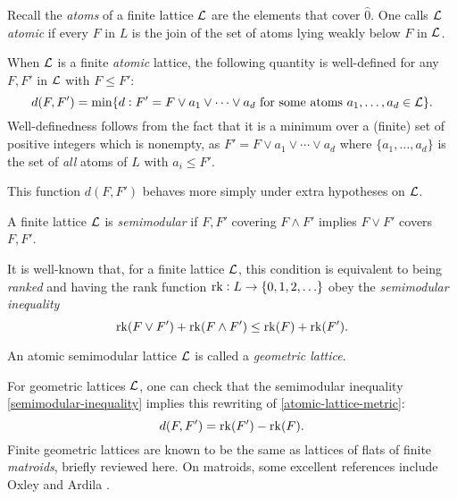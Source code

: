 \begin{defn}
Recall the {\it atoms} of a finite lattice $\mathcal{L}$ are
the elements that cover $\hat{0}$.  One calls $\mathcal{L}$ {\it atomic} if every $F$ in $L$ is the join of the set of atoms lying weakly below $F$ in $\mathcal{L}$.
\end{defn}

When $\mathcal{L}$ is a finite {\it atomic} lattice, the following quantity
is well-defined
for any $F,F'$ in $\mathcal{L}$ with $F \leq F'$:
\begin{equation}
\label{atomic-lattice-metric}
d(F,F')= \min \{d: F'=F \vee a_1 \vee \cdots \vee a_d \text{ for some atoms }a_1,\ldots,a_d \in \mathcal{L}\}.
\end{equation}
Well-definedness follows from the fact that
it is a minimum over a (finite) set of positive integers which is nonempty, as $F'=F \vee a_1 \vee \cdots \vee a_d$ where $\{a_1,\ldots,a_d\}$
is the set of {\it all} atoms of $L$ 
with $a_i \leq F'$.

This function $d(F,F')$ behaves more simply under extra
hypotheses on $\mathcal{L}$.

\begin{defn}
    A finite lattice $\mathcal{L}$ is {\it semimodular} if  $F,F'$ covering $F \wedge F'$ implies
    $F \vee F'$ covers $F, F'$.
\end{defn}

It is well-known \cite[Prop.~3.3.2]{Stanley-EC1} that, for a finite lattice $\mathcal{L}$, this condition is equivalent to being {\it ranked} and having the rank function $\operatorname{\mathrm{rk}}: L \rightarrow \{0,1,2,\ldots\}$ obey the {\it semimodular inequality}
\begin{equation}
\label{semimodular-inequality}
\operatorname{\mathrm{rk}}(F \vee F') + \operatorname{\mathrm{rk}}(F \wedge F') \leq \operatorname{\mathrm{rk}}(F)+\operatorname{\mathrm{rk}}(F').
\end{equation}

\begin{defn}
    An atomic semimodular lattice $\mathcal{L}$ is called a {\it geometric lattice}.
\end{defn}
\noindent For geometric lattices $\mathcal{L}$, one can check that
the semimodular inequality \eqref{semimodular-inequality} implies this rewriting of \eqref{atomic-lattice-metric}:
\begin{equation}
\label{metric-rewritten}
d(F,F')=\operatorname{\mathrm{rk}}(F')-\operatorname{\mathrm{rk}}(F).
\end{equation}
\noindent
Finite geometric lattices are known \cite[\S3.3]{Stanley-EC1} to be the same as lattices of flats of finite {\it matroids}, briefly reviewed here. 
On matroids, some excellent references include Oxley \cite{oxley} and Ardila \cite{icm_matroids}.

